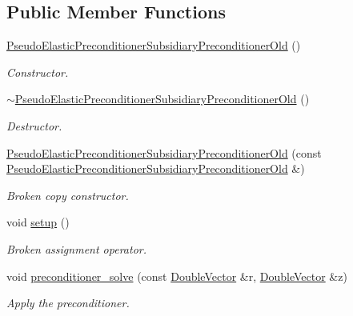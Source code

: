 \subsection*{Public Member Functions}
\begin{DoxyCompactItemize}
\item 
\hyperlink{classoomph_1_1PseudoElasticPreconditionerSubsidiaryPreconditionerOld_a674640dd0de0b3a40857c01e8b868928}{Pseudo\+Elastic\+Preconditioner\+Subsidiary\+Preconditioner\+Old} ()
\begin{DoxyCompactList}\small\item\em Constructor. \end{DoxyCompactList}\item 
\hyperlink{classoomph_1_1PseudoElasticPreconditionerSubsidiaryPreconditionerOld_a231e24badc0c56a577af50891100ecb7}{$\sim$\+Pseudo\+Elastic\+Preconditioner\+Subsidiary\+Preconditioner\+Old} ()
\begin{DoxyCompactList}\small\item\em Destructor. \end{DoxyCompactList}\item 
\hyperlink{classoomph_1_1PseudoElasticPreconditionerSubsidiaryPreconditionerOld_a58a3b8721c6c171175b520315782498b}{Pseudo\+Elastic\+Preconditioner\+Subsidiary\+Preconditioner\+Old} (const \hyperlink{classoomph_1_1PseudoElasticPreconditionerSubsidiaryPreconditionerOld}{Pseudo\+Elastic\+Preconditioner\+Subsidiary\+Preconditioner\+Old} \&)
\begin{DoxyCompactList}\small\item\em Broken copy constructor. \end{DoxyCompactList}\item 
void \hyperlink{classoomph_1_1PseudoElasticPreconditionerSubsidiaryPreconditionerOld_a532201f17edc43b3b475fff2d2744b8b}{setup} ()
\begin{DoxyCompactList}\small\item\em Broken assignment operator. \end{DoxyCompactList}\item 
void \hyperlink{classoomph_1_1PseudoElasticPreconditionerSubsidiaryPreconditionerOld_a01d70c9e3454b52c86f4439d29fd4b22}{preconditioner\+\_\+solve} (const \hyperlink{classoomph_1_1DoubleVector}{Double\+Vector} \&r, \hyperlink{classoomph_1_1DoubleVector}{Double\+Vector} \&z)
\begin{DoxyCompactList}\small\item\em Apply the preconditioner. \end{DoxyCompactList}\item 

\end{DoxyCompactItemize}
